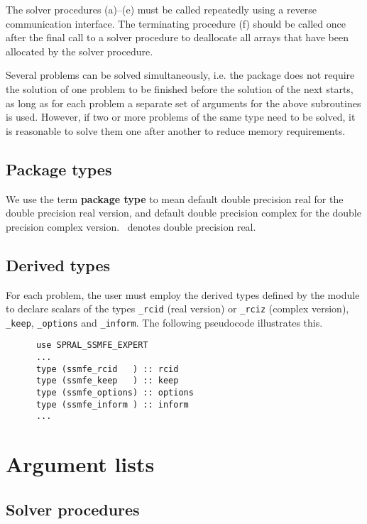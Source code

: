 The solver procedures (a)--(e)
must be called repeatedly using
a reverse communication interface.
The terminating procedure (f)
should be called once after the
final call to 
a solver procedure
to deallocate all arrays 
that have been allocated by %
the solver procedure.

Several problems can be solved simultaneously,
i.e. the package does not require the solution of
one problem to be finished before the solution of
the next starts, as long as for each problem a separate set
of arguments for the above subroutines is used.
However, if two or more problems of the same type
need to be solved, it is reasonable to solve them one
after another  to reduce  memory requirements.
\fi

\subsection{Package types} 

We use the term {\bf package type} to mean
default double precision real for the double precision real version,
and default double precision complex
for the double precision complex version. 
\REALDP\ denotes double precision real.

\subsection{Derived types}
\label{derived types}

For each problem, the user must employ the derived types defined by the
module to declare scalars of the types 
{\tt \solver\_rcid} (real version) or 
{\tt \solver\_rciz} (complex version), 
{\tt \solver\_keep},
{\tt \solver\_options} and 
{\tt \solver\_inform}.
The following pseudocode illustrates this.
\begin{verbatim}
      use SPRAL_SSMFE_EXPERT
      ...
      type (ssmfe_rcid   ) :: rcid
      type (ssmfe_keep   ) :: keep
      type (ssmfe_options) :: options
      type (ssmfe_inform ) :: inform
      ...
\end{verbatim}


\section{Argument lists}

\subsection{Solver procedures}

